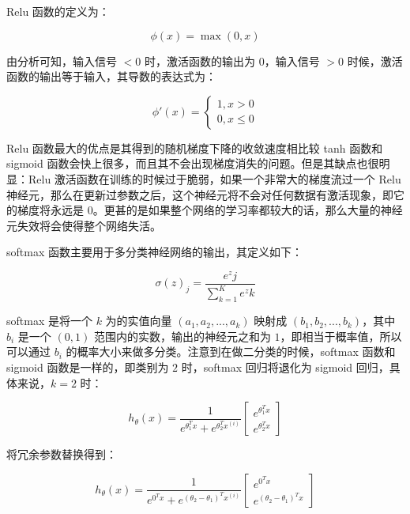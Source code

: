 \documentclass[UTF8]{ctexart}
\begin{document}
Relu 函数的定义为： 

\begin{equation}
\phi(x) = \max(0, x)
\end{equation}

由分析可知，输入信号 $<0$ 时，激活函数的输出为 $0$，输入信号 $>0$ 时候，激活函数的输出等于输入，其导数的表达式为： \par

\begin{equation}
\phi '(x) = \begin{cases}
1, x > 0 \\
0, x \le 0
\end{cases}
\end{equation}

Relu 函数最大的优点是其得到的随机梯度下降的收敛速度相比较 tanh 函数和 sigmoid 函数会快上很多，而且其不会出现梯度消失的问题。但是其缺点也很明显：Relu 激活函数在训练的时候过于脆弱，如果一个非常大的梯度流过一个 Relu 神经元，那么在更新过参数之后，这个神经元将不会对任何数据有激活现象，即它的梯度将永远是 $0$。更甚的是如果整个网络的学习率都较大的话，那么大量的神经元失效将会使得整个网络失活。 \par

softmax 函数主要用于多分类神经网络的输出，其定义如下：

\begin{equation}
\sigma(z)_j = \frac{e^zj}{\sum_{k=1}^{K} e^z k}
\end{equation}

softmax 是将一个 $k$ 为的实值向量 $(a_1,a_2,...,a_k)$ 映射成 $(b_1,b_2,...,b_k)$，其中 $b_i$ 是一个 $(0,1)$ 范围内的实数，输出的神经元之和为 $1$，即相当于概率值，所以可以通过 $b_i$ 的概率大小来做多分类。注意到在做二分类的时候，softmax 函数和 sigmoid 函数是一样的，即类别为 $2$ 时，softmax 回归将退化为 sigmoid 回归，具体来说，$k=2$ 时：\par

\begin{equation}
h_{\theta} (x) = \frac{1}{e^{\theta_{1}^{T} x} + e^{\theta_{2}^{T} x^{(i)}}} \begin{bmatrix}
e^{\theta_{1}^{T} x} \\
e^{\theta_{2}^{T} x}
\end{bmatrix}
\end{equation}

将冗余参数替换得到：

\begin{equation}
h_{\theta} (x) = \frac{1}{e^{0^{T} x} + e^{{(\theta_{2} - \theta_{1})}^{T} x^{(i)}}} \begin{bmatrix}
e^{0^{T} x} \\
e^{{(\theta_{2} - \theta_{1})}^{T} x}
\end{bmatrix}
\end{equation}
\end{document}
